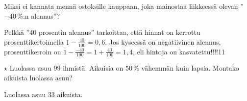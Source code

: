\begin{tehtavasivu}
\begin{tehtava}
Miksi ei kannata mennä ostoksille kauppaan, joka mainostaa liikkeessä olevan ''$-40$\,\%:n alennus''?
	\begin{vastaus}
	Pelkkä ''$40$ prosentin alennus'' tarkoittaa, että hinnat on kerrottu prosenttikertoimella $1-\frac{40}{100}=0,6$. Jos kyseessä on negatiivinen alennus, prosenttikerroin on $1-\frac{-40}{100}=1+\frac{40}{100}=1,4$, eli hintoja on kasvatettu!!!!11
	\end{vastaus}
\end{tehtava}	

\begin{tehtava} 
		$\star$ Luolassa asuu $99$ ihmistä. Aikuisia on $50\,\%$ vähemmän kuin lapsia. Montako aikuista luolassa asuu?
	\begin{vastaus}
	Luolassa asuu $33$ aikuista.
	\end{vastaus}
\end{tehtava}

\end{tehtavasivu}
